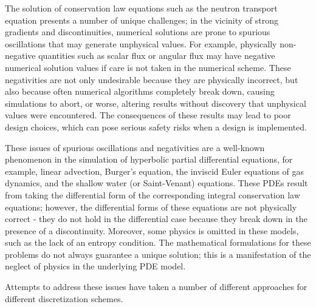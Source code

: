 The solution of conservation law equations such as the neutron transport
equation presents a number of unique challenges; in the vicinity of strong
gradients and discontinuities, numerical solutions are prone to spurious
oscillations that may generate unphysical values. For example, physically
non-negative quantities such as scalar flux or angular flux may have negative
numerical solution values if care is not taken in the numerical scheme.
These negativities are not only undesirable because they are physically
incorrect, but also because often numerical algorithms completely break
down, causing simulations to abort, or worse, altering results without
discovery that unphysical values were encountered. The consequences of
these results may lead to poor design choices, which can pose serious safety
risks when a design is implemented.

These issues of spurious oscillations and negativities are a well-known
phenomenon in the simulation of hyperbolic partial differential equations,
for example, linear advection, Burger's equation, the inviscid Euler equations
of gas dynamics, and the shallow water (or Saint-Venant) equations.
These PDEs result from taking the differential form of the corresponding integral
conservation law equations; however, the differential forms of these equations
are not physically correct - they do not hold in the differential case
because they break down in the presence of a discontinuity.
Moreover, some physics is omitted in these models, such as the
lack of an entropy condition.
The mathematical formulations for these problems
do not always guarantee a unique solution; this is a manifestation of the
neglect of physics in the underlying PDE model.

Attempts to address these issues have taken a number
of different approaches for different discretization schemes.
